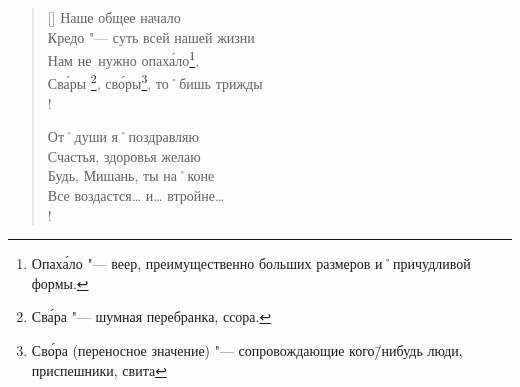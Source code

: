 \begin{verse}[\versewidth]
\vin Наше общее начало              \\
\vin Кредо "--- суть всей нашей жизни  \\
\vin Нам не~нужно опах\'{а}ло\footnote{Опах\'{а}ло "--- веер, преимущественно больших размеров и˚причудливой формы.},          \\
\vin Св\'{а}ры \footnote{Св\'{а}ра "--- шумная перебранка, ссора.}, св\'{о}ры\footnote{Св\'{о}ра (переносное значение) "--- сопровождающие кого\=/нибудь люди, приспешники, свита}, то˚бишь трижды \\!

От˚души я˚поздравляю           \\
Счастья, здоровья желаю        \\
Будь, Мишань, ты на˚коне       \\
Все воздастся… и… втройне…		\\!
\end{verse}
